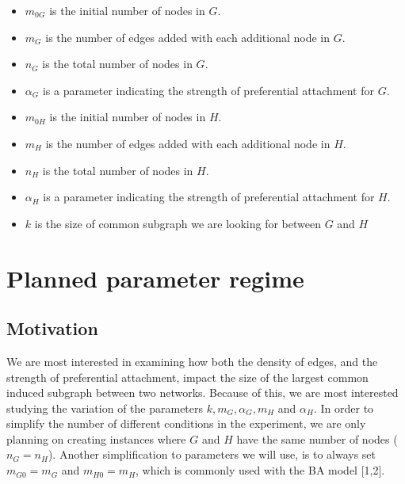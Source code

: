 \documentclass{article}
\begin{document}
\begin{itemize}
  \item $m_{0G}$ is the initial number of nodes in $G$.  
  \item $m_{G} $ is the number of edges added with each additional node in $G$.
  \item $n_G $ is the total number of nodes in $G$.
  \item $\alpha_G$ is a parameter indicating the strength of preferential attachment for $G$.
  \item $m_{0H}$ is the initial number of nodes in $H$.  
  \item $m_{H} $ is the number of edges added with each additional node in $H$.
  \item $n_H $ is the total number of nodes in $H$.
  \item $\alpha_H$ is a parameter indicating the strength of preferential attachment for $H$.
  \item $k$ is the size of common subgraph we are looking for between $G$ and $H$
\end{itemize}




\section{Planned parameter regime}

\subsection{Motivation}
We are most interested in examining how both the density of edges, and the strength of preferential attachment, impact the size of the largest common induced subgraph between two networks. Because of this, we are most interested studying the variation of the parameters $k, m_G, \alpha_G, m_H$ and $\alpha_H$. In order to simplify the number of different conditions in the experiment, we are only planning on creating instances where $G$ and $H$ have the same number of nodes ($n_G = n_H$). Another simplification to parameters we will use, is to always set $m_{G0}=m_G$ and $m_{H0} = m_H$, which is commonly used with the BA model [1,2]. 
\end{document}
